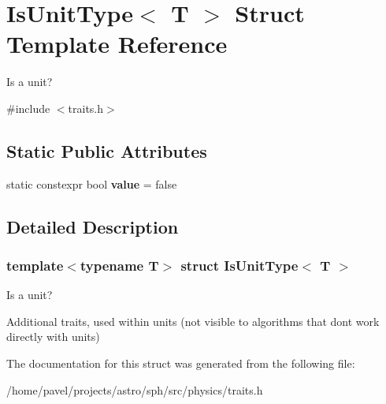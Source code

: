 \hypertarget{structIsUnitType}{}\section{Is\+Unit\+Type$<$ T $>$ Struct Template Reference}
\label{structIsUnitType}


Is a unit?  




{\ttfamily \#include $<$traits.\+h$>$}

\subsection*{Static Public Attributes}
\begin{DoxyCompactItemize}
\item 
\hypertarget{structIsUnitType_abd4a890eadec98d48b14e1ec0457ffc2}{}\label{structIsUnitType_abd4a890eadec98d48b14e1ec0457ffc2} 
static constexpr bool {\bfseries value} = false
\end{DoxyCompactItemize}


\subsection{Detailed Description}
\subsubsection*{template$<$typename T$>$\newline
struct Is\+Unit\+Type$<$ T $>$}

Is a unit? 

Additional traits, used within units (not visible to algorithms that don\textquotesingle{}t work directly with units) 

The documentation for this struct was generated from the following file\+:\begin{DoxyCompactItemize}
\item 
/home/pavel/projects/astro/sph/src/physics/traits.\+h\end{DoxyCompactItemize}
